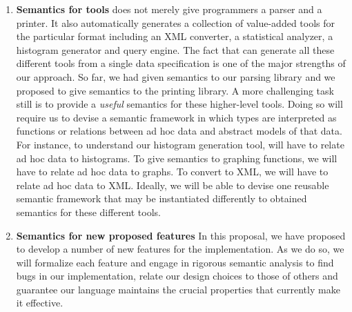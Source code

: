 \begin{enumerate}

\item {\bf Semantics for tools}  \pads{} does not merely give programmers
a parser and a printer.  It also automatically
generates a collection of value-added tools for the particular format including 
an XML converter, a statistical analyzer, a histogram generator and
query engine.  The fact that \pads{} can generate all these different tools
from a single data specification is one of the major strengths of our 
approach.  So far, we had given semantics to our parsing library
and we proposed to give semantics to the printing library.  A more
challenging task still is to provide a {\em useful} semantics for 
these higher-level tools.  Doing so will require us to devise
a semantic framework in which types are interpreted as functions or
relations between ad hoc data and abstract models of that data.  For instance,
to understand our histogram generation tool, will have to relate
ad hoc data to histograms.  To give semantics to graphing functions, 
we will have to relate
ad hoc data to graphs.  To convert to XML, we will have to relate
ad hoc data to XML.  Ideally, we will be able to devise one 
reusable semantic framework that may be instantiated differently to
obtained semantics for these different tools.  

\item {\bf Semantics for new proposed features}
In this proposal, we have proposed to develop a number of new
features for the \pads{} implementation.  As we do so, we will formalize
each feature and engage in rigorous semantic analysis to find bugs
in our implementation, relate our design choices to those of others and 
guarantee our language maintains the crucial properties
that currently make it effective.
\end{enumerate}
